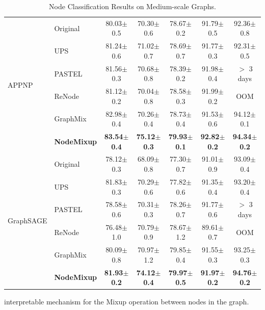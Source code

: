 \documentclass[letterpaper]{article} %
\begin{document}
\begin{table}[!htbp]
\begin{tabular}{l l c c c c c}
    \multirow{6}{*}{APPNP} & Original & 80.03\small{$\pm$0.5} & 70.30\small{$\pm$0.6} & 78.67\small{$\pm$0.2} & 91.79\small{$\pm$0.5} & 92.36\small{$\pm$0.8}\\
    ~ & UPS & 81.24\small{$\pm$0.6} & 71.02\small{$\pm$0.7} & 78.69\small{$\pm$0.7} & 91.77\small{$\pm$0.3} & 92.31\small{$\pm$0.5} \\
    ~ & PASTEL & 81.56\small{$\pm$0.3} & 70.68\small{$\pm$0.8} & 78.39\small{$\pm$0.2} & 91.98\small{$\pm$0.4} & $>$ 3 days\\
    ~ & ReNode & 81.12\small{$\pm$0.2} & 70.04\small{$\pm$0.8} & 78.58\small{$\pm$0.3} &	91.99\small{$\pm$0.2} & OOM \\
    ~ & GraphMix & 82.98\small{$\pm$0.4} & 70.26\small{$\pm$0.4} & 78.73\small{$\pm$0.4} & 91.53\small{$\pm$0.6} & 94.12\small{$\pm$0.1} \\
    ~ & \textbf{NodeMixup} &  \textbf{83.54\small{$\pm$0.4}}  & \textbf{75.12\small{$\pm$0.3}}  & \textbf{79.93\small{$\pm$0.1}} &  \textbf{92.82\small{$\pm$0.2}}  & \textbf{94.34\small{$\pm$0.2}}\\
    \midrule
    \multirow{6}{*}{GraphSAGE} & Original & 78.12\small{$\pm$0.3} & 68.09\small{$\pm$0.8} & 77.30\small{$\pm$0.7} & 91.01\small{$\pm$0.9} & 93.09\small{$\pm$0.4}\\
    ~ & UPS & 81.83\small{$\pm$0.3} & 70.29\small{$\pm$0.6} & 77.82\small{$\pm$0.6} & 91.35\small{$\pm$0.4} & 93.20\small{$\pm$0.4} \\
    ~ & PASTEL & 78.58\small{$\pm$0.6} & 70.31\small{$\pm$0.3} & 78.26\small{$\pm$0.7} & 91.77\small{$\pm$0.6} & $>$ 3 days\\
    ~ & ReNode & 76.48\small{$\pm$1.0} & 70.79\small{$\pm$0.9} & 78.67\small{$\pm$1.2} &	89.61\small{$\pm$0.7} & OOM \\
    ~ & GraphMix & 80.09\small{$\pm$0.8} & 70.97\small{$\pm$1.2} & 79.85\small{$\pm$0.4} & 91.55\small{$\pm$0.3} & 93.25\small{$\pm$0.3} \\
    ~ & \textbf{NodeMixup} & \textbf{81.93\small{$\pm$0.2}} &  \textbf{74.12\small{$\pm$0.4}}  & \textbf{79.97\small{$\pm$0.5}}  & \textbf{91.97\small{$\pm$0.2}} & \textbf{94.76\small{$\pm$0.2}}\\
    \bottomrule
    \hline
    \end{tabular}
    \caption{Node Classification Results on Medium-scale Graphs.}
    \label{tab:results_public}
\end{table}
interpretable mechanism for the Mixup operation between nodes in the graph. 
\end{document}
